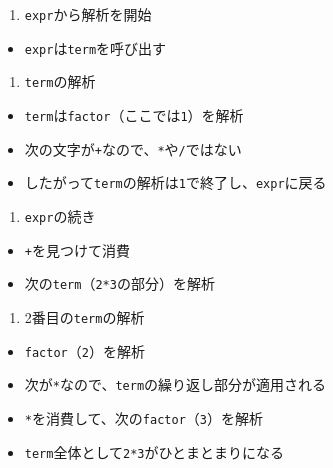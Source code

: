 \begin{enumerate}
\def\labelenumi{\arabic{enumi}.}
\tightlist
\item
  \texttt{expr}から解析を開始
\end{enumerate}

\begin{itemize}
\tightlist
\item
  \texttt{expr}は\texttt{term}を呼び出す
\end{itemize}

\begin{enumerate}
\def\labelenumi{\arabic{enumi}.}
\setcounter{enumi}{1}
\tightlist
\item
  \texttt{term}の解析
\end{enumerate}

\begin{itemize}
\tightlist
\item
  \texttt{term}は\texttt{factor}（ここでは\texttt{1}）を解析
\item
  次の文字が\texttt{+}なので、\texttt{*}や\texttt{/}ではない
\item
  したがって\texttt{term}の解析は\texttt{1}で終了し、\texttt{expr}に戻る
\end{itemize}

\begin{enumerate}
\def\labelenumi{\arabic{enumi}.}
\setcounter{enumi}{2}
\tightlist
\item
  \texttt{expr}の続き
\end{enumerate}

\begin{itemize}
\tightlist
\item
  \texttt{+}を見つけて消費
\item
  次の\texttt{term}（\texttt{2*3}の部分）を解析
\end{itemize}

\begin{enumerate}
\def\labelenumi{\arabic{enumi}.}
\setcounter{enumi}{3}
\tightlist
\item
  2番目の\texttt{term}の解析
\end{enumerate}

\begin{itemize}
\tightlist
\item
  \texttt{factor}（\texttt{2}）を解析
\item
  次が\texttt{*}なので、\texttt{term}の繰り返し部分が適用される
\item
  \texttt{*}を消費して、次の\texttt{factor}（\texttt{3}）を解析
\item
  \texttt{term}全体として\texttt{2*3}がひとまとまりになる
\end{itemize}

